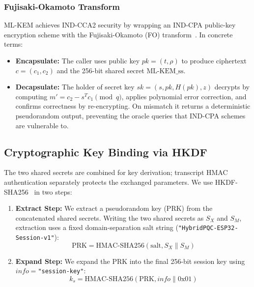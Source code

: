 \documentclass[journal, 10pt]{IEEEtran}
\begin{document}
\subsubsection{Fujisaki-Okamoto Transform}
ML-KEM achieves IND-CCA2 security by wrapping an IND-CPA public-key encryption scheme with the Fujisaki-Okamoto (FO) transform~\cite{b4,b23}. In concrete terms:
\begin{itemize}
    \item \textbf{Encapsulate:} The caller uses public key $pk = (t, \rho)$ to produce ciphertext $c = (c_1, c_2)$ and the 256-bit shared secret $\text{ML-KEM\_ss}$.
    \item \textbf{Decapsulate:} The holder of secret key $sk = (s, pk, H(pk), z)$ decrypts by computing $m' = c_2 - s^T c_1 \pmod{q}$, applies polynomial error correction, and confirms correctness by re-encrypting. On mismatch it returns a deterministic pseudorandom output, preventing the oracle queries that IND-CPA schemes are vulnerable to.
\end{itemize}

\subsection{Cryptographic Key Binding via HKDF}
The two shared secrets are combined for key derivation; transcript HMAC authentication separately protects the exchanged parameters. We use HKDF-SHA256~\cite{b20,b33,b36} in two steps:
\begin{enumerate}
    \item \textbf{Extract Step:} We extract a pseudorandom key (PRK) from the concatenated shared secrets. Writing the two shared secrets as $S_X$ and $S_M$, extraction uses a fixed domain-separation salt string (\texttt{"HybridPQC-ESP32-Session-v1"}):
    \begin{equation}
    \text{PRK} = \text{HMAC-SHA256}(\text{salt}, S_X \parallel S_M)
    \end{equation}
    \item \textbf{Expand Step:} We expand the PRK into the final 256-bit session key using $\mathit{info}=$\texttt{"session-key"}:
    \begin{equation}
    k_s = \text{HMAC-SHA256}(\text{PRK}, \mathit{info} \parallel \text{0x01})
    \end{equation}
\end{enumerate}
\end{document}
